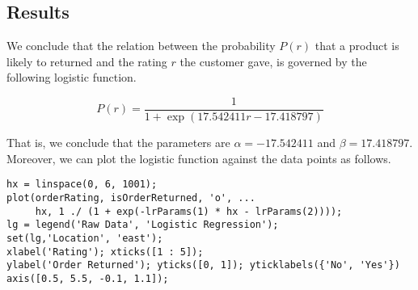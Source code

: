 \subsection{Results}

We conclude that the relation between the probability $P(r)$ that a product is likely to returned and the rating $r$ the customer gave, is governed by the following logistic function.

$$P(r) = \frac{1}{1 + \exp(17.542411 r - 17.418797)}$$

\noindent
That is, we conclude that the parameters are $\alpha = -17.542411$ and $\beta = 17.418797$. Moreover, we can plot the logistic function against the data points as follows.

\begin{lstlisting}
hx = linspace(0, 6, 1001);
plot(orderRating, isOrderReturned, 'o', ...
     hx, 1 ./ (1 + exp(-lrParams(1) * hx - lrParams(2))));
lg = legend('Raw Data', 'Logistic Regression');
set(lg,'Location', 'east');
xlabel('Rating'); xticks([1 : 5]);
ylabel('Order Returned'); yticks([0, 1]); yticklabels({'No', 'Yes'})
axis([0.5, 5.5, -0.1, 1.1]);
\end{lstlisting}


